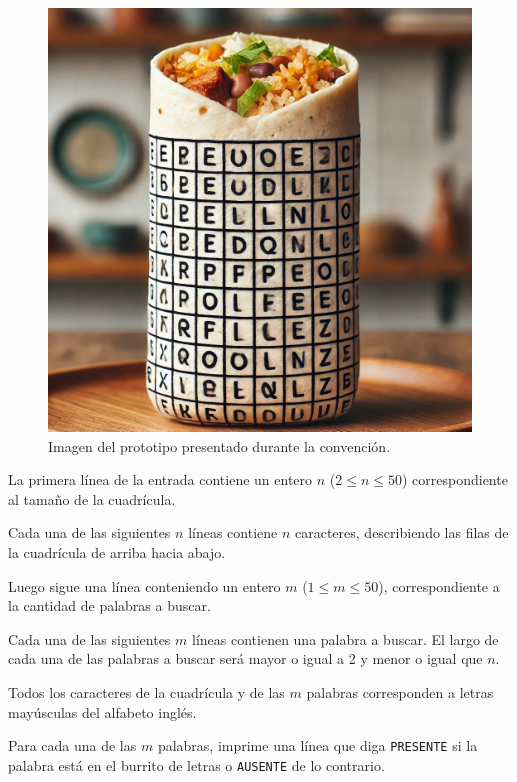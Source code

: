 \documentclass{oci}
\begin{document}
\begin{problemDescription}
  \begin{figure}[h]
  \centering
  \includegraphics[scale=0.145]{burrito-1.png}
  \caption{Imagen del prototipo presentado durante la convención.}
  \end{figure}
\end{problemDescription}

\begin{inputDescription}
  La primera línea de la entrada contiene un entero $n$ ($2 \leq n \leq 50$) correspondiente
  al tamaño de la cuadrícula.

  Cada una de las siguientes $n$ líneas contiene $n$ caracteres, describiendo
  las filas de la cuadrícula de arriba hacia abajo.

  Luego sigue una línea conteniendo un entero $m$ ($1 \leq m \leq 50$), correspondiente
  a la cantidad de palabras a buscar.

  Cada una de las siguientes $m$ líneas contienen una palabra a buscar.
  El largo de cada una de las palabras a buscar será mayor o igual a 2 y menor o igual
  que $n$.

  Todos los caracteres de la cuadrícula y de las $m$ palabras corresponden a letras mayúsculas
  del alfabeto inglés.
\end{inputDescription}

\begin{outputDescription}
  Para cada una de las $m$ palabras, imprime una línea que diga \texttt{PRESENTE} si la palabra está
  en el burrito de letras o \texttt{AUSENTE} de lo contrario.
\end{outputDescription}
\end{document}
